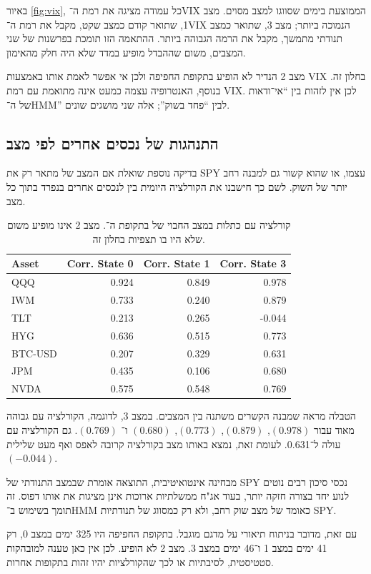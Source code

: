 באיור \ref{fig:vix}, כל עמודה מציגה את רמת ה־VIX הממוצעת בימים שסווגו למצב מסוים. מצב 1, שתואר קודם כמצב שקט, מקבל את רמת ה־VIX הנמוכה ביותר; מצב 3, שתואר כמצב תנודתי מתמשך, מקבל את הרמה הגבוהה ביותר. ההתאמה הזו תומכת בפרשנות של שני המצבים, משום שההבדל מופיע במדד שלא היה חלק מהאימון.

מצב 2 הנדיר לא הופיע בתקופת החפיפה ולכן אי אפשר לאמת אותו באמצעות VIX בחלון זה. בנוסף, האנטרופיה עצמה כמעט אינה מתואמת עם רמת VIX. לכן אין לזהות בין ``אי־ודאות של ה־HMM'' לבין ``פחד בשוק''; אלה שני מושגים שונים.

\subsection{התנהגות של נכסים אחרים לפי מצב }

בדיקה נוספת שואלת אם המצב של  מתאר רק את SPY עצמו, או שהוא קשור גם למבנה רחב יותר של השוק. לשם כך חישבנו את הקורלציה היומית בין  לנכסים אחרים בנפרד בתוך כל מצב.

\begin{table}[H]
\centering
\small
\begin{english}
\begin{tabular}{l r r r}
\toprule
Asset & Corr. State 0 & Corr. State 1 & Corr. State 3 \\
\midrule
QQQ & 0.924 & 0.849 & 0.978 \\
IWM & 0.733 & 0.240 & 0.879 \\
TLT & 0.213 & 0.265 & -0.044 \\
HYG & 0.636 & 0.515 & 0.773 \\
BTC-USD & 0.207 & 0.329 & 0.631 \\
JPM & 0.435 & 0.106 & 0.680 \\
NVDA & 0.575 & 0.548 & 0.769 \\
\bottomrule
\end{tabular}
\end{english}
\caption{קורלציה עם  כתלות במצב החבוי של  בתקופת ה־. מצב 2 אינו מופיע משום שלא היו בו תצפיות בחלון זה.}
\label{tab:crossasset}
\end{table}

הטבלה מראה שמבנה הקשרים משתנה בין המצבים. במצב 3, לדוגמה, הקורלציה עם  גבוהה מאוד עבור  \((0.978)\),  \((0.879)\),  \((0.773)\),  \((0.680)\) ו־ \((0.769)\). גם הקורלציה עם  עולה ל־0.631. לעומת זאת,  נמצא באותו מצב בקורלציה קרובה לאפס ואף מעט שלילית \((-0.044)\).

מבחינה אינטואיטיבית, התוצאה אומרת שבמצב התנודתי של SPY נכסי סיכון רבים נוטים לנוע יחד בצורה חזקה יותר, בעוד אג"ח ממשלתיות ארוכות אינן מציגות את אותו דפוס. זה תומך בשימוש ב־HMM כאומד של מצב שוק רחב, ולא רק כמסווג של תנודתיות SPY.

עם זאת, מדובר בניתוח תיאורי על מדגם מוגבל. בתקופת החפיפה היו 325 ימים במצב 0, רק 41 ימים במצב 1 ו־46 ימים במצב 3. מצב 2 לא הופיע. לכן אין כאן טענה למובהקות סטטיסטית, לסיבתיות או לכך שהקורלציות יהיו זהות בתקופות אחרות.
